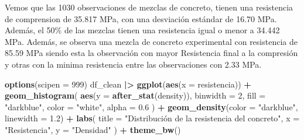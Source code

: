 \documentclass[
]{book}
\newenvironment{Shaded}{\begin{snugshade}}{\end{snugshade}}
\newcommand{\AttributeTok}[1]{\textcolor[rgb]{0.13,0.29,0.53}{#1}}
\newcommand{\DecValTok}[1]{\textcolor[rgb]{0.00,0.00,0.81}{#1}}
\newcommand{\FloatTok}[1]{\textcolor[rgb]{0.00,0.00,0.81}{#1}}
\newcommand{\FunctionTok}[1]{\textcolor[rgb]{0.13,0.29,0.53}{\textbf{#1}}}
\newcommand{\NormalTok}[1]{#1}
\newcommand{\SpecialCharTok}[1]{\textcolor[rgb]{0.81,0.36,0.00}{\textbf{#1}}}
\newcommand{\StringTok}[1]{\textcolor[rgb]{0.31,0.60,0.02}{#1}}
\begin{document}
\begin{table}[!h]
\centering
\caption{(\#tab:Concrete Compressive strenght)Estadisticas descriptivas de la resistencia a la compresion}
\centering
{}
\end{table}

Vemos que las 1030 observaciones de mezclas de concreto, tienen una resistencia de comprension de 35.817 MPa, con una desviación estándar de 16.70 MPa. Además, el 50\% de las mezclas tienen una resistencia igual o menor a 34.442 MPa. Además, se observa una mezcla de concreto experimental con resistencia de 85.59 MPa siendo esta la observación con mayor Resistencia final a la compresión y otras con la minima resistencia entre las observaciones con 2.33 MPa.

\begin{Shaded}
\begin{Highlighting}[]
\FunctionTok{options}\NormalTok{(}\AttributeTok{scipen =} \DecValTok{999}\NormalTok{)}
\NormalTok{df\_clean }\SpecialCharTok{|\textgreater{}} 
  \FunctionTok{ggplot}\NormalTok{(}\FunctionTok{aes}\NormalTok{(}\AttributeTok{x =}\NormalTok{ resistencia)) }\SpecialCharTok{+}
  \FunctionTok{geom\_histogram}\NormalTok{(}
    \FunctionTok{aes}\NormalTok{(}\AttributeTok{y =} \FunctionTok{after\_stat}\NormalTok{(density)),}
    \AttributeTok{binwidth =} \DecValTok{2}\NormalTok{,}
    \AttributeTok{fill =} \StringTok{"darkblue"}\NormalTok{,}
    \AttributeTok{color =} \StringTok{"white"}\NormalTok{,}
    \AttributeTok{alpha =} \FloatTok{0.6}
\NormalTok{  ) }\SpecialCharTok{+}
  \FunctionTok{geom\_density}\NormalTok{(}\AttributeTok{color =} \StringTok{"darkblue"}\NormalTok{, }\AttributeTok{linewidth =} \FloatTok{1.2}\NormalTok{) }\SpecialCharTok{+}
  \FunctionTok{labs}\NormalTok{(}
    \AttributeTok{title =} \StringTok{"Distribución de la resistencia del concreto"}\NormalTok{,}
    \AttributeTok{x =} \StringTok{"Resistencia"}\NormalTok{,}
    \AttributeTok{y =} \StringTok{"Densidad"}
\NormalTok{  ) }\SpecialCharTok{+}
  \FunctionTok{theme\_bw}\NormalTok{()}
\end{Highlighting}
\end{Shaded}
\end{document}
